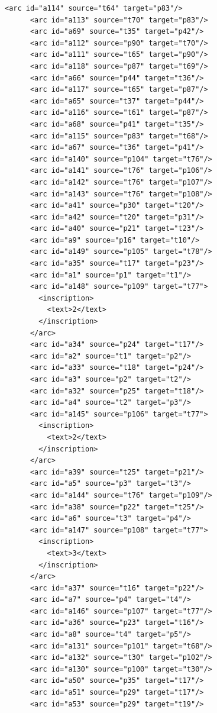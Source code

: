 \begin{multicols}{2}
\begin{lstlisting}[basicstyle=\ttfamily\tiny]
      <arc id="a114" source="t64" target="p83"/>
      <arc id="a113" source="t70" target="p83"/>
      <arc id="a69" source="t35" target="p42"/>
      <arc id="a112" source="p90" target="t70"/>
      <arc id="a111" source="t65" target="p90"/>
      <arc id="a118" source="p87" target="t69"/>
      <arc id="a66" source="p44" target="t36"/>
      <arc id="a117" source="t65" target="p87"/>
      <arc id="a65" source="t37" target="p44"/>
      <arc id="a116" source="t61" target="p87"/>
      <arc id="a68" source="p41" target="t35"/>
      <arc id="a115" source="p83" target="t68"/>
      <arc id="a67" source="t36" target="p41"/>
      <arc id="a140" source="p104" target="t76"/>
      <arc id="a141" source="t76" target="p106"/>
      <arc id="a142" source="t76" target="p107"/>
      <arc id="a143" source="t76" target="p108"/>
      <arc id="a41" source="p30" target="t20"/>
      <arc id="a42" source="t20" target="p31"/>
      <arc id="a40" source="p21" target="t23"/>
      <arc id="a9" source="p16" target="t10"/>
      <arc id="a149" source="p105" target="t78"/>
      <arc id="a35" source="t17" target="p23"/>
      <arc id="a1" source="p1" target="t1"/>
      <arc id="a148" source="p109" target="t77">
        <inscription>
          <text>2</text>
        </inscription>
      </arc>
      <arc id="a34" source="p24" target="t17"/>
      <arc id="a2" source="t1" target="p2"/>
      <arc id="a33" source="t18" target="p24"/>
      <arc id="a3" source="p2" target="t2"/>
      <arc id="a32" source="p25" target="t18"/>
      <arc id="a4" source="t2" target="p3"/>
      <arc id="a145" source="p106" target="t77">
        <inscription>
          <text>2</text>
        </inscription>
      </arc>
      <arc id="a39" source="t25" target="p21"/>
      <arc id="a5" source="p3" target="t3"/>
      <arc id="a144" source="t76" target="p109"/>
      <arc id="a38" source="p22" target="t25"/>
      <arc id="a6" source="t3" target="p4"/>
      <arc id="a147" source="p108" target="t77">
        <inscription>
          <text>3</text>
        </inscription>
      </arc>
      <arc id="a37" source="t16" target="p22"/>
      <arc id="a7" source="p4" target="t4"/>
      <arc id="a146" source="p107" target="t77"/>
      <arc id="a36" source="p23" target="t16"/>
      <arc id="a8" source="t4" target="p5"/>
      <arc id="a131" source="p101" target="t68"/>
      <arc id="a132" source="t30" target="p102"/>
      <arc id="a130" source="p100" target="t30"/>
      <arc id="a50" source="p35" target="t17"/>
      <arc id="a51" source="p29" target="t17"/>
      <arc id="a53" source="p29" target="t19"/>

\end{lstlisting}
\end{multicols}
